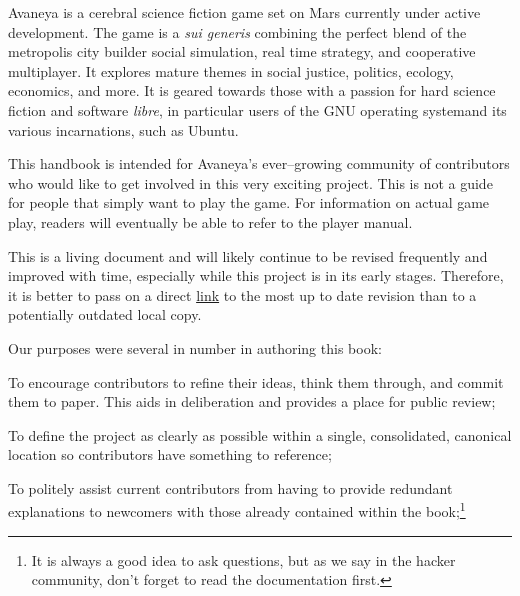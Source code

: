 

Avaneya is a cerebral science fiction game set on Mars currently under active development. The game is a {\it sui generis} combining the perfect blend of the metropolis city builder social simulation, real time strategy, and cooperative multiplayer. It explores mature themes in social justice, politics, ecology, economics, and more. It is geared towards those with a passion for hard science fiction and software {\it libre}, in particular users of the GNU operating system and its various incarnations, such as Ubuntu.

This handbook is intended for Avaneya's ever--growing community of contributors who would like to get involved in this very exciting project. This is not a guide for people that simply want to play the game. For information on actual game play, readers will eventually be able to refer to the player manual.

This is a living document and will likely continue to be revised frequently and improved with time, especially while this project is in its early stages. Therefore, it is better to pass on a direct \href{\LatestHandbookURL}{link} to the most up to date revision than to a potentially outdated local copy.

Our purposes were several in number in authoring this book:

\startitemize[4]
\item
To encourage contributors to refine their ideas, think them through, and commit them to paper. This aids in deliberation and provides a place for public review;

\item
To define the project as clearly as possible within a single, consolidated, canonical location so contributors have something to reference;

\item
To politely assist current contributors from having to provide redundant explanations to newcomers with those already contained within the book;\footnote[rtfm]{It is always a good idea to ask questions, but as we say in the hacker community, don't forget to read the documentation first.}

